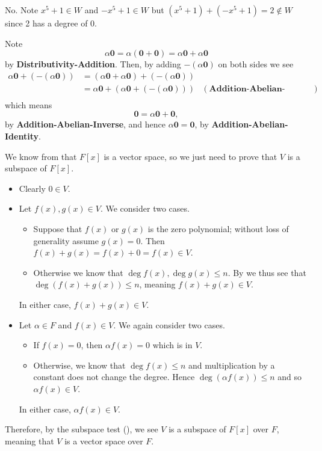 \begin{questions}
    \item No. Note $x^5 + 1 \in W$ and $-x^5 + 1 \in W$ but $(x^5+1) + (-x^5+1) = 2 \notin W$ since 2 has a degree of 0.

    \item Note
    \[
        \alpha\mathbf{0} = \alpha(\mathbf{0} + \mathbf{0}) = \alpha\mathbf{0} + \alpha\mathbf{0}
    \]
    by \textbf{Distributivity-Addition}. Then, by adding $-(\alpha\mathbf{0})$ on both sides we see
    \begin{align*}
        \alpha\mathbf{0} + (-(\alpha\mathbf{0})) &= (\alpha\mathbf{0} + \alpha\mathbf{0}) + (-(\alpha\mathbf{0}))\\
        &= \alpha\mathbf{0} + (\alpha\mathbf{0} + (-(\alpha\mathbf{0}))) & (\textbf{Addition-Abelian-Associativity})\\
    \end{align*}
    which means
    \[
        \mathbf{0} = \alpha\mathbf{0} + \mathbf{0},
    \]
    by \textbf{Addition-Abelian-Inverse}, and hence $\alpha\mathbf{0} = \mathbf{0}$, by \textbf{Addition-Abelian-Identity}.

    \item We know from  that $F[x]$ is a vector space, so we just need to prove that $V$ is a subspace of $F[x]$.
    \begin{itemize}
        \item Clearly $0 \in V$.
        \item Let $f(x), g(x) \in V$. We consider two cases.
        \begin{itemize}
            \item Suppose that $f(x)$ or $g(x)$ is the zero polynomial; without loss of generality assume $g(x) = 0$. Then $f(x) + g(x) = f(x) + 0 = f(x) \in V$.
            \item Otherwise we know that $\deg f(x), \deg g(x) \leq n$. By  we thus see that $\deg (f(x) + g(x)) \leq n$, meaning $f(x) + g(x) \in V$.
        \end{itemize}
        In either case, $f(x) + g(x) \in V$.
        \item Let $\alpha \in F$ and $f(x) \in V$. We again consider two cases.
        \begin{itemize}
            \item If $f(x) = 0$, then $\alpha f(x) = 0$ which is in $V$.
            \item Otherwise, we know that $\deg f(x) \leq n$ and multiplication by a constant does not change the degree. Hence $\deg (\alpha f(x)) \leq n$ and so $\alpha f(x) \in V$.
        \end{itemize}
        In either case, $\alpha f(x) \in V$.
    \end{itemize}
    Therefore, by the subspace test (), we see $V$ is a subspace of $F[x]$ over $F$, meaning that $V$ is a vector space over $F$.


\end{questions}
